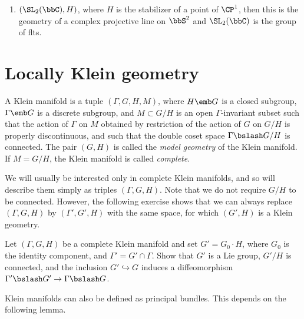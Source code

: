 \begin{example}
\begin{enumerate}
        \item $(\SL_2(\bbC),H)$, where $H$ is the stabilizer of a point of $\CP^1$, then this is the geometry of a complex projective line on $\bbS^2$ and $\SL_2(\bbC)$ is the group of \glspl{flt}.
    \end{enumerate}
\end{example}









\section{Locally Klein geometry}\label{sec: locally Klein geom}


\begin{defn}
    A Klein manifold is a tuple $(\Gamma,G,H, M)$, where $H\emb G$ is a closed subgroup, $\Gamma\emb G$ is a discrete subgroup, and $M\subset G\slash H$ is an open $\Gamma$-invariant subset such that the action of $\Gamma$ on $M$ obtained by restriction of the action of $G$ on $G\slash H$ is properly discontinuous, and such that the double coset space $\Gamma\bslash G\slash H$ is connected. The pair $(G,H)$ is called the \emph{model geometry} of the Klein manifold. If $M=G\slash H$, the Klein manifold is called \emph{complete}.
\end{defn}

We will usually be interested only in complete Klein manifolds, and so will describe them simply as triples $(\Gamma,G,H)$. Note that we do not require $G\slash H$ to be connected. However, the following exercise shows that we can always replace $(\Gamma,G,H)$ by $(\Gamma',G',H)$ with the same space, for which $(G',H)$ is a Klein geometry.

\begin{xca}
    Let $(\Gamma,G,H)$ be a complete Klein manifold and set $G'=G_0\cdot H$, where $G_0$ is the identity component, and $\Gamma'=G'\cap \Gamma$. Show that $G'$ is a Lie group, $G'\slash H$ is connected, and the inclusion $G'\hookrightarrow G$ induces a diffeomorphism $\Gamma'\bslash G'\to \Gamma\bslash G$.
\end{xca}

Klein manifolds can also be defined as principal bundles. This depends on the following lemma.

